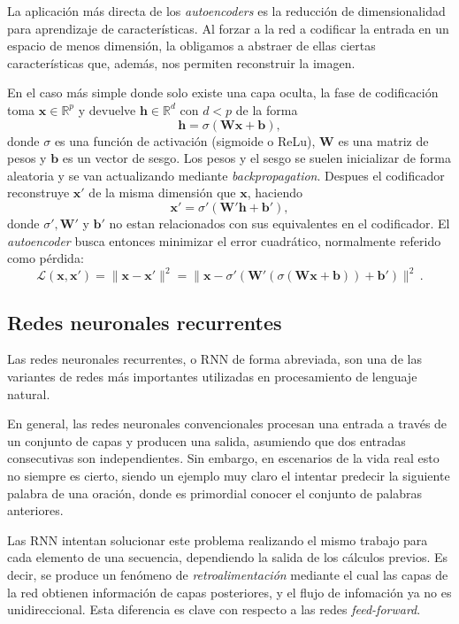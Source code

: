 \documentclass[
  a4paper,
  12pt,
  spanish,
]{scrartcl}
\theoremstyle{teorema-style}
\begin{document}
La aplicación más directa de los \textit{autoencoders} es la reducción de
dimensionalidad para aprendizaje de características. Al forzar a la red a
codificar la entrada en un espacio de menos dimensión, la obligamos a abstraer
de ellas ciertas características que, además, nos permiten reconstruir la
imagen.

En el caso más simple donde solo existe una capa oculta, la fase de codificación
toma $\pmb x \in \mathbb{R}^p$ y devuelve $\pmb h \in \mathbb{R}^d$ con $d < p$ de la
forma
\[
\pmb h = \sigma (\pmb W \pmb x+\pmb b),
\]
donde $\sigma$ es una función de activación (sigmoide o ReLu), $\pmb W$ es una matriz
de pesos y $\pmb b$ es un vector de sesgo. Los pesos y el sesgo se suelen inicializar
de forma aleatoria y se van actualizando mediante \textit{backpropagation}.
Despues el codificador reconstruye $\pmb x'$ de la misma dimensión que $\pmb x$, haciendo
\[
\pmb x' = \sigma' (\pmb W' \pmb h + \pmb b'),
\]
donde $\sigma', \pmb W'$ y $\pmb b'$ no estan relacionados con sus equivalentes en el codificador. El \textit{autoencoder} busca entonces minimizar el error cuadrático, normalmente
referido como pérdida:
\[
\mathcal{L}(\pmb x, \pmb x') = \|\pmb x-\pmb x'\|^2 = \|\pmb x - \sigma'(\pmb W'(\sigma(\pmb W \pmb x + \pmb b))+ \pmb b')\|^2\,.
\]

\subsection{Redes neuronales recurrentes}%
\label{sub:redes_neuronales_recurrentes}

Las redes neuronales recurrentes, o RNN de forma abreviada, son una de las variantes de redes más importantes utilizadas en procesamiento de lenguaje natural.

En general, las redes neuronales convencionales procesan una entrada a través de un conjunto de capas y producen una salida, asumiendo que dos entradas consecutivas son independientes. Sin embargo, en escenarios de la vida real esto no siempre es cierto, siendo un ejemplo muy claro el intentar predecir la siguiente palabra de una oración, donde es primordial conocer el conjunto de palabras anteriores.

Las RNN intentan solucionar este problema realizando el mismo trabajo para cada elemento de una secuencia, dependiendo la salida de los cálculos previos. Es decir, se produce un fenómeno de \textit{retroalimentación} mediante el cual las capas de la red obtienen información de capas posteriores, y el flujo de infomación ya no es unidireccional. Esta diferencia es clave con respecto a las redes \textit{feed-forward}.
\end{document}
